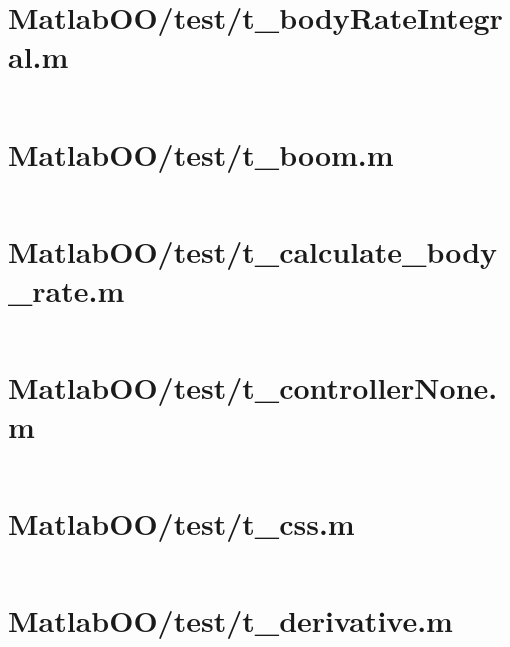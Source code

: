\pagebreak
\section*{MatlabOO/test/t\_bodyRateIntegral.m}\label{code:MatlabOO/test/t_bodyRateIntegral.m}
\inputminted[linenos,fontsize=\scriptsize]{matlab}{/home/dcouture/git/mathyourlife/TSatPy/beta_versions/matlab_object_oriented/test/t_bodyRateIntegral.m}

\pagebreak
\section*{MatlabOO/test/t\_boom.m}\label{code:MatlabOO/test/t_boom.m}
\inputminted[linenos,fontsize=\scriptsize]{matlab}{/home/dcouture/git/mathyourlife/TSatPy/beta_versions/matlab_object_oriented/test/t_boom.m}

\pagebreak
\section*{MatlabOO/test/t\_calculate\_body\_rate.m}\label{code:MatlabOO/test/t_calculate_body_rate.m}
\inputminted[linenos,fontsize=\scriptsize]{matlab}{/home/dcouture/git/mathyourlife/TSatPy/beta_versions/matlab_object_oriented/test/t_calculate_body_rate.m}

\pagebreak
\section*{MatlabOO/test/t\_controllerNone.m}\label{code:MatlabOO/test/t_controllerNone.m}
\inputminted[linenos,fontsize=\scriptsize]{matlab}{/home/dcouture/git/mathyourlife/TSatPy/beta_versions/matlab_object_oriented/test/t_controllerNone.m}

\pagebreak
\section*{MatlabOO/test/t\_css.m}\label{code:MatlabOO/test/t_css.m}
\inputminted[linenos,fontsize=\scriptsize]{matlab}{/home/dcouture/git/mathyourlife/TSatPy/beta_versions/matlab_object_oriented/test/t_css.m}

\pagebreak
\section*{MatlabOO/test/t\_derivative.m}\label{code:MatlabOO/test/t_derivative.m}
\inputminted[linenos,fontsize=\scriptsize]{matlab}{/home/dcouture/git/mathyourlife/TSatPy/beta_versions/matlab_object_oriented/test/t_derivative.m}


